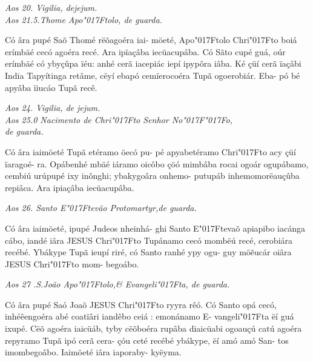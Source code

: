 \documentclass[openany,titlepage,12pt]{book}
\newcommand{\lgS}{\char"017F}
\newcommand{\lgSS}{\char"017F\char"017F}
\begin{document}
\begin{center}
    \textit{\footnotesize
    Aos 20. Vigilia, dejejum.\\
    Aos 21.5.Thome Apo\lgS tolo, de guarda.
}
\end{center}

{\hspace*{-2ex}Có âra pupé Saõ Thomé rëõagoéra iai-
möeté, Apo\lgS tolo Chri\lgS to  boiá erímbäé cecó
agoéra recé. Ara ipïaçâba iecüacupâba. Có
Sãto cupé guá, oúr erímbäé có ybyçûpa ïéu:
anhé cerã iacepiác iepí ipypôra iâba. Ké çüí
cerã ïaçâbi India Tapyítinga retâme, cëyí
ebapó cemïerocoéra Tupã ogoerobiár. Eba-
pó bé apyâba ïiucáo Tupã recê.}

\begin{center}
    \textit{\footnotesize
Aos 24. Vigilia, de jejum.\\
Aos 25.0 Nacimento de Chri\lgS to Senhor No\lgSS o,\\
de guarda.
}
\end{center}

{\hspace*{-2ex}Có âra iaimöeté Tupã etéramo öecó pu-
pé apyabetéramo Chri\lgS to  acy çüí ïaragoé-
ra. Opábenhé mbäé iáramo oicôbo çöó
mimbâba rocai ogoár ogupábamo, cembiú
urúpupé ixy inônghi; ybakygoâra onhemo-
putupáb inhemomorëauçûba repiâca. Ara
ipiaçâba iecüacupâba.}

\begin{center}
    \textit{\footnotesize
Aos 26. Santo E\lgS tevão Protomartyr,de guarda.
}
\end{center}

{\hspace*{-2ex}Có âra iaimöeté, ipupé Judeos nheinhá-\newpage
\unskip
\hspace*{-4ex}ghi Santo E\lgS tevaõ apiapibo iacánga cábo,
iandé iâra JESUS Chri\lgS to  Tupánamo cecó
mombëú recé, cerobiára recébé. Ybákype
Tupã ieupí riré, có Santo ranhé ypy ogu-
guy mö\~eucár oiâra JESUS Chri\lgS to mom-
begoábo.}

\begin{center}
    \textit{\footnotesize
Aos 27 .S.João Apo\lgS tolo,\& Evangeli\lgS ta, de guarda.
}
\end{center}

{\hspace{-2ex}Có âra pupé Saó Joaõ JESUS Chri\lgS to\linebreak
ryyra rêó. Có Santo opá cecó, inhéêengoéra
abé coatïâri iandêbo ceiá : emonánamo E-
vangeli\lgS ta ëí guá ixupé. Cëõ agoéra iaicüáb,
tyby cëõboéra rupâba diaicüabi ogoauçú\linebreak
catú agoéra repyramo Tupã ipó cerã cera-
çóu ceté recébé ybákype, ëí amó amó San-
tos imombegoâbo. Iaimöeté iâra iaporaby-
kyëyma.}
\end{document}
